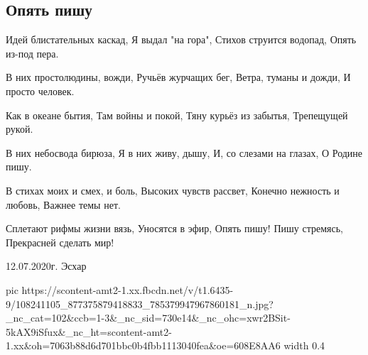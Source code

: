  
 
 
 
 

\subsection{Опять пишу}
\label{sec:12_07_2020.fb.motin_jurij.1.stih_idei_pismo}

Идей блистательных каскад,
Я выдал "на гора",
Стихов струится водопад,
Опять из-под пера.

В них простолюдины, вожди,
Ручьёв журчащих бег,
Ветра, туманы и дожди,
И просто человек.

Как в океане бытия,
Там войны и покой,
Тяну курьёз из забытья,
Трепещущей рукой.

В них небосвода бирюза,
Я в них живу, дышу,
И, со слезами на глазах,
О Родине пишу.

В стихах моих и смех, и боль,
Высоких чувств рассвет,
Конечно нежность и любовь,
Важнее темы нет.

Сплетают рифмы жизни вязь,
Уносятся в эфир,
Опять пишу! Пишу стремясь,
Прекрасней сделать мир!

12.07.2020г. Эсхар

\ifcmt
  pic https://scontent-amt2-1.xx.fbcdn.net/v/t1.6435-9/108241105_877375879418833_785379947967860181_n.jpg?_nc_cat=102&ccb=1-3&_nc_sid=730e14&_nc_ohc=xwr2BSit-5kAX9iSfux&_nc_ht=scontent-amt2-1.xx&oh=7063b88d6d701bbc0b4fbb1113040fea&oe=608E8AA6
  width 0.4
\fi

